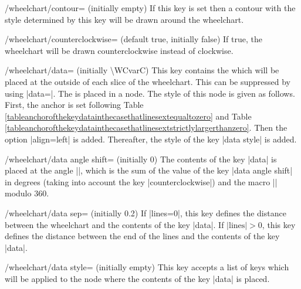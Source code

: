 \documentclass[a4paper,english,dvipsnames]{ltxdoc}
\begin{document}
\begin{stylekey}{/wheelchart/contour= (initially \normalfont empty)}
If this key is set then a contour with the style determined by this key will be drawn around the wheelchart.
\end{stylekey}
\begin{key}{/wheelchart/counterclockwise= (default true, initially false)}
If true, the wheelchart will be drawn counterclockwise instead of clockwise.
\begin{codeexample}[width=10cm]
\begin{tikzpicture}
\wheelchart[
    counterclockwise,
    middle=counterclockwise,
    middle style={font=\ttfamily}
]{\exampleforthismanual}
\end{tikzpicture}
\end{codeexample}
\end{key}
\begin{key}{/wheelchart/data= (initially \textbackslash WCvarC)}
This key contains the  which will be placed at the outside of each slice of the wheelchart. This can be suppressed by using |data={}|. The  is placed in a node. The style of this node is given as follows. First, the anchor is set following Table \ref{tableanchorofthekeydatainthecasethatlinesextequaltozero} and Table \ref{tableanchorofthekeydatainthecasethatlinesextstrictlylargerthanzero}. Then the option |align=left| is added. Thereafter, the style of the key |data style| is added.
\end{key}
\begin{key}{/wheelchart/data angle shift= (initially 0)}
The contents of the key |data| is placed at the angle |\WCdataangle|, which is the sum of the value of the key |data angle shift| in degrees (taking into account the key |counterclockwise|) and the macro |\WCmidangle| modulo $360$.
\end{key}
\begin{key}{/wheelchart/data sep= (initially 0.2)}
If |lines=0|, this key defines the distance between the wheelchart and the contents of the key |data|. If $\text{|lines|}>0$, this key defines the distance between the end of the lines and the contents of the key |data|.
\end{key}
\begin{stylekey}{/wheelchart/data style= (initially \normalfont empty)}
This key accepts a list of keys which will be applied to the node where the contents of the key |data| is placed.
\end{stylekey}
\end{document}
